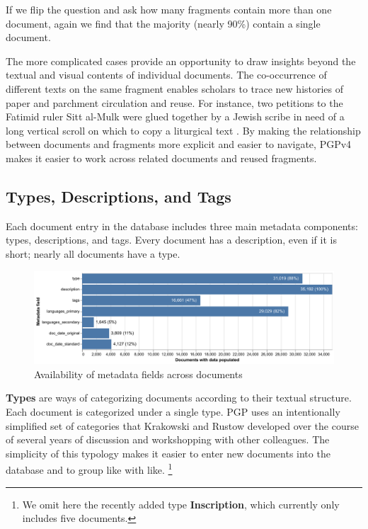 \documentclass{article}
\begin{document}

If we flip the question and ask how many fragments contain more than one document, again we find that the majority (nearly 90\%) contain a single document.

The more complicated cases provide an opportunity to draw insights beyond the textual and visual contents of individual documents. The co-occurrence of different texts on the same fragment enables scholars to trace new histories of paper and parchment circulation and reuse. For instance, two petitions to the Fatimid ruler Sitt al-Mulk \autocite{noauthor_state_1024, noauthor_state_1021} were glued together by a Jewish scribe in need of a long vertical scroll on which to copy a liturgical text . By making the relationship between documents and fragments more explicit and easier to navigate, PGPv4 makes it easier to work across related documents and reused fragments.

\subsection{Types, Descriptions, and Tags}

Each document entry in the database includes three main metadata components: types, descriptions, and tags. Every document has a description, even if it is short; nearly all documents have a type.

\begin{figure}[!hbt]
    \centering
    \includegraphics[width=1.0\linewidth]{charts/metadata_available.pdf}
    \caption{Availability of metadata fields across documents}
    \label{fig:metadata-status}
\end{figure}

\textbf{Types} are ways of categorizing documents according to their textual structure. Each document is categorized under a single type. PGP uses an intentionally simplified set of categories that Krakowski and Rustow developed over the course of several years of discussion and workshopping with other colleagues. The simplicity of this typology makes it easier to enter new documents into the database and to group like with like. \footnote{We omit here the recently added type \textbf{Inscription}, which currently only includes five documents.}
\end{document}
